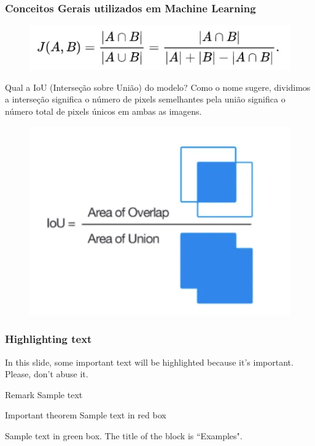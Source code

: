 \documentclass{beamer}
\begin{document}
\begin{frame}
	\frametitle{Conceitos Gerais utilizados em Machine Learning}
	\begin{figure}
		\centering
		\includegraphics[width=0.4\linewidth]{figures/iou_formula}
	\end{figure}
	\begin{block}{Qual a IoU (Interseção sobre União) do modelo?}
		Como o nome sugere, dividimos a interseção significa o número de pixels semelhantes pela união significa o número total de pixels únicos em ambas as imagens.
	\end{block}
	\begin{figure}
		\centering
		\includegraphics[width=0.3\linewidth]{figures/iou_formula1}
	\end{figure}
	
\end{frame}

\begin{frame}	
\frametitle{Highlighting text}
%
In this slide, some important text will be
\alert{highlighted} because it's important.
Please, don't abuse it.

\begin{block}{Remark}
Sample text
\end{block}

\begin{alertblock}{Important theorem}
Sample text in red box
\end{alertblock}

\begin{examples}
Sample text in green box. The title of the block is ``Examples".
\end{examples}
\end{frame}
\end{document}
